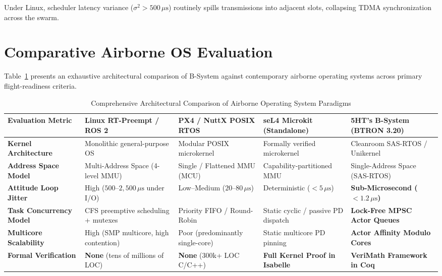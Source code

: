 \documentclass[10pt,journal,compsoc,twocolumn]{article}
\begin{document}
Under Linux, scheduler latency variance ($\sigma^2 > 500\,\mu\text{s}$) routinely spills transmissions into adjacent slots, collapsing TDMA synchronization across the swarm.

\section{Comparative Airborne OS Evaluation}
\label{sec:audit}

Table~\ref{tab:os_comparison} presents an exhaustive architectural comparison of B-System against contemporary airborne operating systems across primary flight-readiness criteria.

\begin{table}[t]
\centering
\caption{Comprehensive Architectural Comparison of Airborne Operating System Paradigms}
\label{tab:os_comparison}
\scriptsize
\setlength{\tabcolsep}{3.5pt}
\renewcommand{\arraystretch}{1.12}
\begin{tabularx}{\textwidth}{@{} >{\raggedright\arraybackslash\bfseries}p{2.8cm} >{\raggedright\arraybackslash}X >{\raggedright\arraybackslash}X >{\raggedright\arraybackslash}X >{\raggedright\arraybackslash}X @{}}
\toprule
Evaluation Metric & Linux RT-Preempt / ROS 2 & PX4 / NuttX POSIX RTOS & seL4 Microkit (Standalone) & 5HT's B-System (BTRON 3.20) \\
\midrule
Kernel Architecture & Monolithic general-purpose OS & Modular POSIX microkernel & Formally verified microkernel & Cleanroom SAS-RTOS / Unikernel \\
Address Space Model & Multi-Address Space (4-level MMU) & Single / Flattened MMU (MCU) & Capability-partitioned MMU & Single-Address Space (SAS-RTOS) \\
Attitude Loop Jitter & High ($500\text{--}2{,}500\,\mu\text{s}$ under I/O) & Low--Medium ($20\text{--}80\,\mu\text{s}$) & Deterministic ($<5\,\mu\text{s}$) & \textbf{Sub-Microsecond ($<1.2\,\mu\text{s}$)} \\
Task Concurrency Model & CFS preemptive scheduling + mutexes & Priority FIFO / Round-Robin & Static cyclic / passive PD dispatch & \textbf{Lock-Free MPSC Actor Queues} \\
Multicore Scalability & High (SMP multicore, high contention) & Poor (predominantly single-core) & Static multicore PD pinning & \textbf{Actor Affinity Modulo Cores} \\
Formal Verification & \textbf{None} (tens of millions of LOC) & \textbf{None} (300k+ LOC C/C++) & \textbf{Full Kernel Proof in Isabelle} & \textbf{VeriMath Framework in Coq} \\

\end{tabularx}
\end{table}
\end{document}

